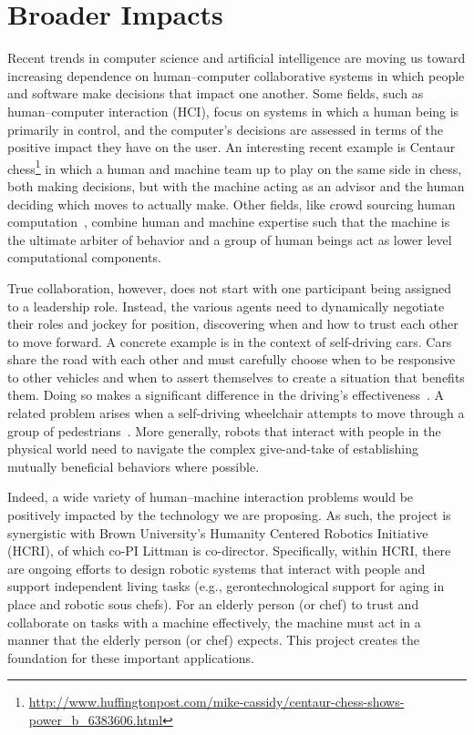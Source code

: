 
\section{Broader Impacts}

Recent trends in computer science and artificial intelligence are
moving us toward increasing dependence on human--computer
collaborative systems in which people and software make decisions that
impact one another.  Some fields, such as human--computer interaction
(HCI), focus on systems in which a human being is primarily in
control, and the computer's decisions are assessed in terms of the
positive impact they have on the user.  An interesting recent example
is Centaur
chess\footnote{\url{http://www.huffingtonpost.com/mike-cassidy/centaur-chess-shows-power_b_6383606.html}}
in which a human and machine team up to play on the same side in
chess, both making decisions, but with the machine acting as an
advisor and the human deciding which moves to actually make.  Other
fields, like crowd sourcing human computation~\cite{von2009human},
combine human and machine expertise such that the machine is the
ultimate arbiter of behavior and a group of human beings act as lower
level computational components.

True collaboration, however, does not start with one participant being
assigned to a leadership role.  Instead, the various agents need to
dynamically negotiate their roles and jockey for position, discovering
when and how to trust each other to move forward.  A concrete example
is in the context of self-driving cars.  Cars share the road with each
other and must carefully choose when to be responsive to other
vehicles and when to assert themselves to create a situation that
benefits them.  Doing so makes a significant difference in the
driving's effectiveness~\cite{cunningham2015mpdm}.  A related problem
arises when a self-driving wheelchair attempts to move through a group
of pedestrians~\cite{kim2016socially}.  More generally, robots that
interact with people in the physical world need to navigate the
complex give-and-take of establishing mutually beneficial behaviors
where possible.

Indeed, a wide variety of human--machine interaction problems would be
positively impacted by the technology we are proposing.
%
As such, the project is synergistic with Brown University's Humanity
Centered Robotics Initiative (HCRI), of which co-PI Littman is
co-director.  Specifically, within HCRI, there are ongoing efforts to
design robotic systems that interact with people and support
independent living tasks (e.g., gerontechnological support for aging
in place and robotic sous chefs).  For an elderly person (or chef) to
trust and collaborate on tasks with a machine effectively, the machine
must act in a manner that the elderly person (or chef) expects.  This
project creates the foundation for these important applications.


